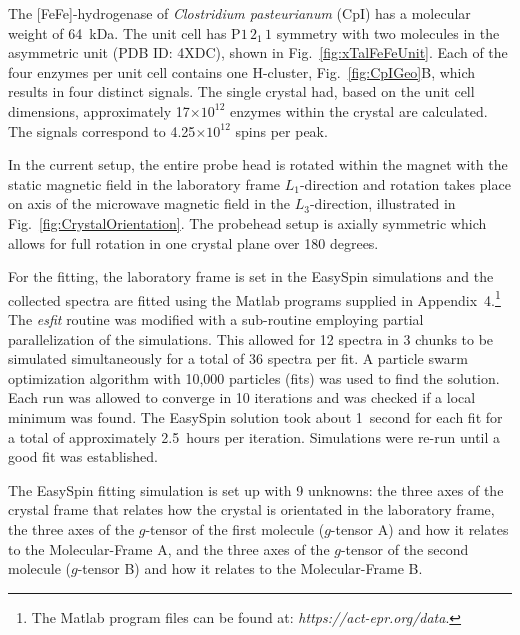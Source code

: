 The [FeFe]-hydrogenase of \textit{Clostridium pasteurianum} (CpI) has a molecular weight of 64~kDa. The unit cell has P$1\,2_1\,1$ symmetry with two molecules in the asymmetric unit (PDB ID: 4XDC), shown in Fig.~\ref{fig:xTalFeFeUnit}. Each of the four enzymes per unit cell contains one H-cluster, Fig.~\ref{fig:CpIGeo}B, which results in four distinct signals. The single crystal had, based on the unit cell dimensions, approximately 17$\times10^{12}$ enzymes within the crystal are calculated. The signals correspond to 4.25$\times10^{12}$ spins per peak. 

In the current setup, the entire probe head is rotated within the magnet with the static magnetic field in the laboratory frame $L_1$-direction and rotation takes place on axis of the microwave magnetic field in the $L_3$-direction, illustrated in Fig.~\ref{fig:CrystalOrientation}. The probehead setup is axially symmetric which allows for full rotation in one crystal plane over 180 degrees. 

For the fitting, the laboratory frame is set in the EasySpin simulations and the collected spectra are fitted using the Matlab programs supplied in Appendix~4.\footnote{The Matlab program files can be found at: \textit{https://act-epr.org/data}.} The \textit{esfit} routine was modified with a sub-routine employing partial parallelization of the simulations. This allowed for 12 spectra in 3 chunks to be simulated simultaneously for a total of 36 spectra per fit. A particle swarm optimization algorithm with 10,000 particles (fits) was used to find the solution. Each run was allowed to converge in 10 iterations and was checked if a local minimum was found. The EasySpin solution took about 1~second for each fit for a total of approximately 2.5~hours per iteration. Simulations were re-run until a good fit was established.

The EasySpin fitting simulation is set up with 9 unknowns: the three axes of the crystal frame that relates how the crystal is orientated in the laboratory frame, the three axes of the $g$-tensor of the first molecule ($g$-tensor A) and how it relates to the Molecular-Frame A, and the three axes of the $g$-tensor of the second molecule ($g$-tensor B) and how it relates to the Molecular-Frame B. 

